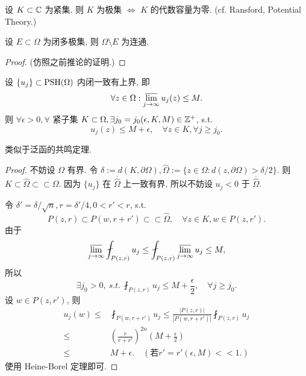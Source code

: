 \begin{remark}
  设 $K \subset {\mathbb C}$ 为紧集. 则 $K$ 为极集 $\iff$ $K$ 的代数容量为零. (cf. Ransford, Potential Theory.)    
\end{remark}

\begin{proposition}
  设 $E \subset \Omega $ 为闭多极集, 则 $\Omega \setminus E$ 为连通.   
\end{proposition}
\begin{proof}
  (仿照之前推论的证明.)
\end{proof}

\begin{lemma}[Hartogs]\label{lem2.1}
  设 $\{u_j\} \subset \operatorname{PSH}(\Omega )$ 内闭一致有上界, 即 
  $$\forall z \in \Omega : \varlimsup_{j \to \infty }u_j(z) \leq M. $$  
  则 $\forall \epsilon >0, \forall $ 紧子集 $K \subset \Omega , \exists j_0=j_0(\epsilon ,K,M) \in {\mathbb Z}^{+}$, s.t. 
  $$ u_j(z) \leq M+\epsilon , \quad \forall z \in K, \forall j \geq j_0. $$  
\end{lemma}
\begin{remark}
  类似于泛函的共鸣定理.
\end{remark}
\begin{proof}
  不妨设 $\Omega $ 有界. 令 $\delta :=d(K, \partial \Omega ), \hat{\Omega }:=\{z \in \Omega : d(z, \partial \Omega ) > \delta /2\}$. 
  则 $K \subset \hat{\Omega } \subset \subset \Omega $. 
  因为 $\{u_j\}$ 在 $\overline{\hat{\Omega }}$ 上一致有界, 所以不妨设 $u_j<0$ 于 $\overline{\hat{\Omega }}$.
  
  令 $\delta '=\delta / \sqrt{n}, r= \delta '/4, 0<r'<r$, s.t. 
  $$ P(z,r) \subset P(w,r+r') \subset \subset \hat{\Omega }, \quad \forall z \in K, w \in P(z,r') .$$ 
  由于 
  $$ \varlimsup_{j \to \infty } \fint_{P(z,r)} u_j \leq  \fint_{P(z,r)} \varlimsup_{j \to \infty } u_j \leq M, $$
  所以 
  $$ \exists j_0 >0, ~s.t.~ \fint_{P(z,r)} u_j \leq M +\frac{\epsilon }{2}, \quad \forall j \geq j_0 .$$
  设 $w \in P(z,r')$, 则 
  $$ \begin{aligned}
    u_j(w) \leq& \fint_{P(w,r+r')} u_j \leq \frac{\left| P(z,r) \right| }{\left|P(w,r+r')\right|} \fint_{P(z,r)} u_j \\
    \leq& \left(  \frac{r}{r+r'} \right)^{2n} \left( M+\frac{\epsilon }{2} \right) \\
    \leq& M+ \epsilon. \quad (\text{若} r'=r'(\epsilon ,M) <<1.)
  \end{aligned}  $$
使用 Heine-Borel 定理即可.
\end{proof}


